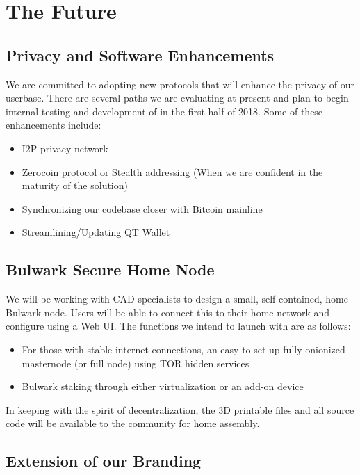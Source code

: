 \documentclass[11pt,a4paperpaper,]{report}
\providecommand{\tightlist}{%
  \setlength{\itemsep}{0pt}\setlength{\parskip}{0pt}}
\begin{document}
\chapter{The Future}\label{the-future}

\section{Privacy and Software
Enhancements}\label{privacy-and-software-enhancements}

We are committed to adopting new protocols that will enhance the privacy
of our userbase. There are several paths we are evaluating at present
and plan to begin internal testing and development of in the first half
of 2018. Some of these enhancements include:

\begin{itemize}
\tightlist
\item
  I2P privacy network
\item
  Zerocoin protocol or Stealth addressing (When we are confident in the
  maturity of the solution)
\item
  Synchronizing our codebase closer with Bitcoin mainline
\item
  Streamlining/Updating QT Wallet
\end{itemize}

\section{Bulwark Secure Home Node}\label{bulwark-secure-home-node}

We will be working with CAD specialists to design a small,
self-contained, home Bulwark node. Users will be able to connect this to
their home network and configure using a Web UI. The functions we intend
to launch with are as follows:

\begin{itemize}
\tightlist
\item
  For those with stable internet connections, an easy to set up fully
  onionized masternode (or full node) using TOR hidden services
\item
  Bulwark staking through either virtualization or an add-on device
\end{itemize}

In keeping with the spirit of decentralization, the 3D printable files
and all source code will be available to the community for home
assembly.

\section{Extension of our Branding}\label{extension-of-our-branding}
\end{document}
